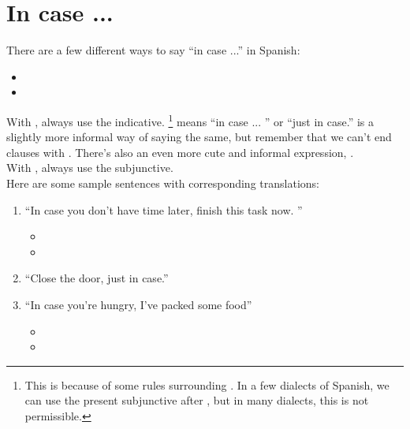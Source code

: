 \section{In case ...}
\label{sec:incase}
There are a few different ways to say ``in case ...'' in Spanish: 
\begin{itemize}[noitemsep]
	\item {}
	\item {}
\end{itemize}

With , always use the indicative. \footnote{This is because of some rules surrounding . In a few dialects of Spanish, we can use the present subjunctive after , but in many dialects, this is not permissible. }  means ``in case ... '' or ``just in case.''  is a slightly more informal way of saying the same, but remember that we can't end clauses with . There's also an even more cute and informal expression, . \\ 


With , always use the subjunctive. \\  


Here are some sample sentences with corresponding translations:
\begin{enumerate}[noitemsep]
	\item ``In case you don't have time later, finish this task now. '' \arr
		\begin{itemize}[noitemsep]
			\item {}
			\item {}
		\end{itemize}
	\item ``Close the door, just in case.'' \arr {}
	\item ``In case you're hungry, I've packed some food'' \arr
		\begin{itemize}[noitemsep]
			\item {}
			\item {}
		\end{itemize}
\end{enumerate}


